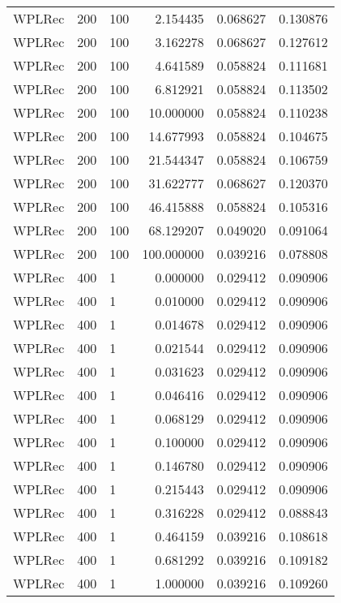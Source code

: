 \begin{tabular}{lllrrr}
 WPLRec &  200 &    100 &    2.154435 &     0.068627 &  0.130876 \\
 WPLRec &  200 &    100 &    3.162278 &     0.068627 &  0.127612 \\
 WPLRec &  200 &    100 &    4.641589 &     0.058824 &  0.111681 \\
 WPLRec &  200 &    100 &    6.812921 &     0.058824 &  0.113502 \\
 WPLRec &  200 &    100 &   10.000000 &     0.058824 &  0.110238 \\
 WPLRec &  200 &    100 &   14.677993 &     0.058824 &  0.104675 \\
 WPLRec &  200 &    100 &   21.544347 &     0.058824 &  0.106759 \\
 WPLRec &  200 &    100 &   31.622777 &     0.068627 &  0.120370 \\
 WPLRec &  200 &    100 &   46.415888 &     0.058824 &  0.105316 \\
 WPLRec &  200 &    100 &   68.129207 &     0.049020 &  0.091064 \\
 WPLRec &  200 &    100 &  100.000000 &     0.039216 &  0.078808 \\
 WPLRec &  400 &      1 &    0.000000 &     0.029412 &  0.090906 \\
 WPLRec &  400 &      1 &    0.010000 &     0.029412 &  0.090906 \\
 WPLRec &  400 &      1 &    0.014678 &     0.029412 &  0.090906 \\
 WPLRec &  400 &      1 &    0.021544 &     0.029412 &  0.090906 \\
 WPLRec &  400 &      1 &    0.031623 &     0.029412 &  0.090906 \\
 WPLRec &  400 &      1 &    0.046416 &     0.029412 &  0.090906 \\
 WPLRec &  400 &      1 &    0.068129 &     0.029412 &  0.090906 \\
 WPLRec &  400 &      1 &    0.100000 &     0.029412 &  0.090906 \\
 WPLRec &  400 &      1 &    0.146780 &     0.029412 &  0.090906 \\
 WPLRec &  400 &      1 &    0.215443 &     0.029412 &  0.090906 \\
 WPLRec &  400 &      1 &    0.316228 &     0.029412 &  0.088843 \\
 WPLRec &  400 &      1 &    0.464159 &     0.039216 &  0.108618 \\
 WPLRec &  400 &      1 &    0.681292 &     0.039216 &  0.109182 \\
 WPLRec &  400 &      1 &    1.000000 &     0.039216 &  0.109260 \\

\end{tabular}
